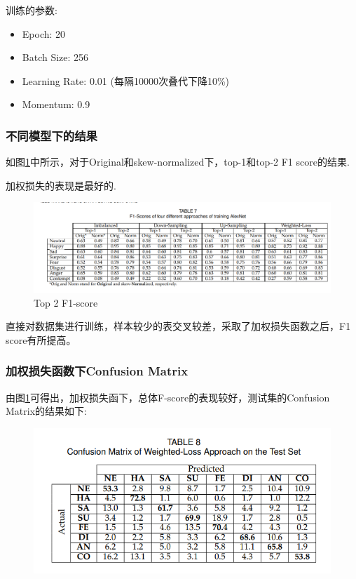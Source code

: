 \documentclass[11pt, a4paper]{article}
\begin{document}
\begin{CJK}{UTF8}{gbsn}
训练的参数:

\begin{itemize}
\item Epoch: 20
\item Batch Size: 256
\item Learning Rate: 0.01 (每隔10000次叠代下降10\%)
\item Momentum: 0.9
\end{itemize}

\subsubsection{不同模型下的结果}

如图\ref{Fig:t7}中所示，对于Original和skew-normalized下，top-1和top-2 F1 score的结果.

加权损失的表现是最好的.

\begin{figure}[htbp]
	
	\centering %
	\includegraphics[width=15cm]{fscore}
	
	\caption{Top 2 F1-score}
	\label{Fig:t7}
\end{figure}

直接对数据集进行训练，样本较少的表交叉较差，采取了加权损失函数之后，F1 score有所提高。

\subsubsection{加权损失函数下Confusion Matrix}

由图\ref{Fig:t7}可得出，加权损失函下，总体F-score的表现较好，测试集的Confusion Matrix的结果如下:

\begin{figure}[htbp]
	
	\centering %
	\includegraphics[width=13cm]{table8}
	

\end{figure}
\end{CJK}
\end{document}
